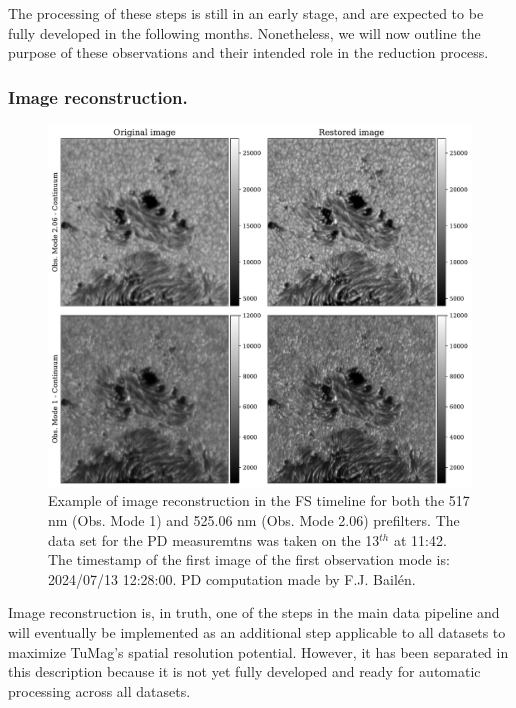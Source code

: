 The processing of these steps is still in an early stage, and are expected to be fully developed in the following months. Nonetheless, we will now outline the purpose of these observations and their intended role in the reduction process.
\subsubsection{Image reconstruction.}

\begin{figure}[h]
  \begin{minipage}[c]{0.67\textwidth}
    \includegraphics[width=\textwidth]{figures/Pipeline/Image_restoration.pdf}
  \end{minipage}\hfill
  \begin{minipage}[c]{0.29\textwidth}
    \caption[Image reconstruction.]{
     Example of image reconstruction in the FS timeline for both the 517 nm (Obs. Mode 1) and 525.06 nm (Obs. Mode 2.06) prefilters. The data set for the PD measuremtns was taken on the 13$^{th}$ at 11:42. The timestamp of the first image of the first observation mode is: 2024/07/13 12:28:00. PD computation made by F.J. Bailén.
     \label{fig_pipeline:  image_restoration}} 
  \end{minipage}
\end{figure}

Image reconstruction is, in truth, one of the steps in the main data pipeline and will eventually be implemented as an additional step applicable to all datasets to maximize TuMag's spatial resolution potential. However, it has been separated in this description because it is not yet fully developed and ready for automatic processing across all datasets.

